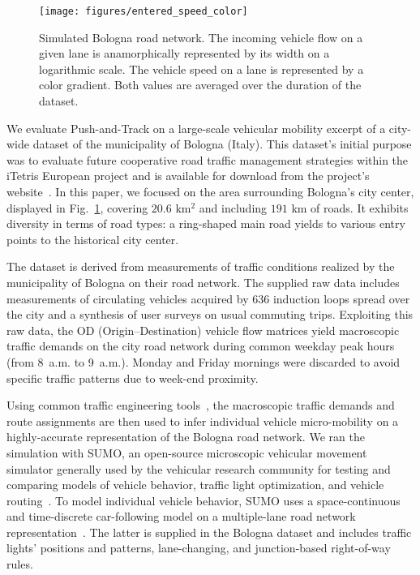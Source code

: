 \documentclass[preprint]{elsarticle}
\begin{document}
\begin{figure}
    \centering
    \texttt{[image: figures/entered\_speed\_color]}
    \caption{Simulated Bologna road network. The incoming vehicle flow on a given lane is anamorphically represented by its width on a logarithmic scale. The vehicle speed on a lane is represented by a color gradient. Both values are averaged over the duration of the dataset.}
    \label{fig_map}
\end{figure}

We evaluate Push-and-Track on a large-scale vehicular mobility excerpt of a city-wide dataset of the municipality of Bologna (Italy). This dataset's initial purpose was to evaluate future cooperative road traffic management strategies within the iTetris European project and is available for download from the project's website~\cite{itetris}. In this paper, we focused on the area surrounding Bologna's city center, displayed in Fig.~\ref{fig_map}, covering $20.6$ km$^2$ and including $191$ km of roads. It exhibits diversity in terms of road types: a ring-shaped main road yields to various entry points to the historical city center.

The dataset is derived from measurements of traffic conditions realized by the municipality of Bologna on their road network. The supplied raw data includes measurements of circulating vehicles acquired by 636 induction loops spread over the city and a synthesis of user surveys on usual commuting trips. Exploiting this raw data, the OD (Origin--Destination) vehicle flow matrices yield macroscopic traffic demands on the city road network during common weekday peak hours (from 8~a.m. to 9~a.m.). Monday and Friday mornings were discarded to avoid specific traffic patterns due to week-end proximity.

Using common traffic engineering tools~\cite{vissim}, the macroscopic traffic demands and route assignments are then used to infer individual vehicle micro-mobility on a highly-accurate representation of the Bologna road network. We ran the simulation with SUMO, an open-source microscopic vehicular movement simulator generally used by the vehicular research community for testing and comparing models of vehicle behavior, traffic light optimization, and vehicle routing~\cite{krajzewicz2002sumo}. To model individual vehicle behavior, SUMO uses a space-continuous and time-discrete car-following model on a multiple-lane road network representation~\cite{zpr98-319}. The latter is supplied in the Bologna dataset and includes traffic lights' positions and patterns, lane-changing, and junction-based right-of-way rules.
\end{document}
